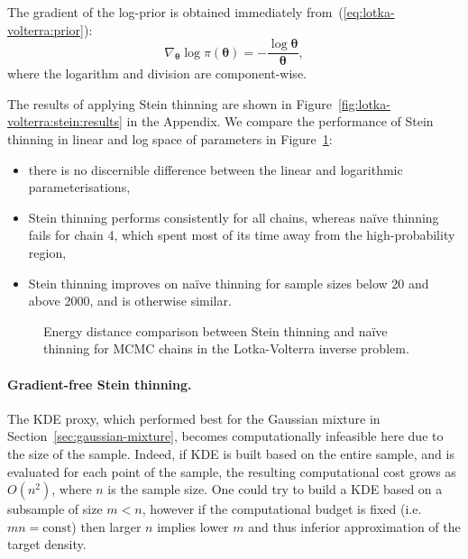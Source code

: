 \documentclass[11pt,a4paper]{report}
\begin{document}
The gradient of the log-prior is obtained immediately from~(\ref{eq:lotka-volterra:prior}):
\begin{equation*}
\nabla_{\pmb{\theta}} \log \pi(\pmb{\theta}) = -\frac{\log \pmb{\theta}}{\pmb{\theta}},
\end{equation*}
where the logarithm and division are component-wise.

The results of applying Stein thinning are shown in Figure~\ref{fig:lotka-volterra:stein:results} in the Appendix. We compare the performance of Stein thinning in linear and log space of parameters in Figure~\ref{fig:lotka-volterra:stein-thinning:energy-distance}:
\begin{itemize}
\item there is no discernible difference between the linear and logarithmic parameterisations,
\item Stein thinning performs consistently for all chains, whereas na\"ive thinning fails for chain 4, which spent most of its time away from the high-probability region,
\item Stein thinning improves on na\"ive thinning for sample sizes below 20 and above 2000, and is otherwise similar.
\end{itemize}

\begin{figure}[h]
\centering
{}
\caption{Energy distance comparison between Stein thinning and na\"ive thinning for MCMC chains in the Lotka-Volterra inverse problem.
\label{fig:lotka-volterra:stein-thinning:energy-distance}}
\end{figure}

\paragraph{Gradient-free Stein thinning.} The KDE proxy, which performed best for the Gaussian mixture in Section~\ref{sec:gaussian-mixture}, becomes computationally infeasible here due to the size of the sample. Indeed, if KDE is built based on the entire sample, and is evaluated for each point of the sample, the resulting computational cost grows as $O(n^2)$, where $n$ is the sample size. One could try to build a KDE based on a subsample of size $m < n$, however if the computational budget is fixed (i.e. $mn = \text{const}$) then larger $n$ implies lower $m$ and thus inferior approximation of the target density.
\end{document}
